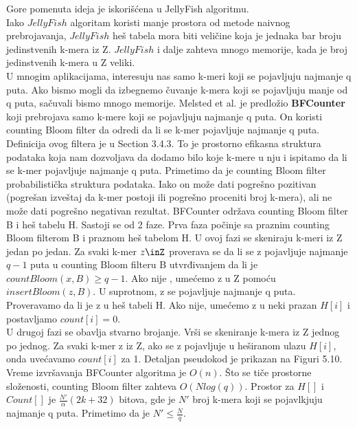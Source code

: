 \documentclass{article}
\begin{document}
Gore pomenuta ideja je iskorišćena u JellyFish algoritmu.\\

Iako $JellyFish$ algoritam koristi manje prostora od metode naivnog prebrojavanja, $JellyFish$ heš tabela mora biti veličine koja je jednaka bar broju jedinstvenih k-mera iz Z. $JellyFish$ i dalje zahteva mnogo memorije, kada je broj jedinstvenih k-mera u Z veliki.\\

U mnogim aplikacijama, interesuju nas samo k-meri koji se pojavljuju najmanje q puta. Ako bismo mogli da izbegnemo čuvanje k-mera koji se pojavljuju manje od q puta, sačuvali bismo mnogo memorije. Melsted et al. je predložio \textbf{BFCounter} koji prebrojava samo k-mere koji se pojavljuju najmanje q puta. On koristi counting Bloom filter da odredi da li se k-mer pojavljuje najmanje q puta. Definicija ovog filtera je u Section 3.4.3. To je prostorno efikasna struktura podataka koja nam dozvoljava da dodamo bilo koje k-mere u nju i ispitamo da li se k-mer pojavljuje najmanje q puta. Primetimo da je counting Bloom filter probabilistička struktura podataka. Iako on može dati pogrešno pozitivan (pogrešan izveštaj da k-mer postoji ili pogrešno proceniti broj k-mera), ali ne može dati pogrešno negativan rezultat. BFCounter održava counting Bloom filter B i heš tabelu H. Sastoji se od 2 faze. Prva faza počinje sa praznim counting Bloom filterom B i praznom heš tabelom H. U ovoj fazi se skeniraju k-meri iz Z jedan po jedan. Za svaki k-mer $z\inZ$ proverava se da li se z pojavljuje najmanje $q - 1$ puta u counting Bloom  filteru B utvrđivanjem da li je $countBloom(x, B) \geq q-1$. Ako nije , umećemo z u Z pomoću $insertBloom(z, B)$. U suprotnom, z se pojavljuje najmanje q puta. Proveravamo da li je z u heš tabeli H. Ako nije, umećemo z u neki prazan $H[i]$ i postavljamo $count[i] = 0$. \\

U drugoj fazi se obavlja stvarno brojanje. Vrši se skeniranje k-mera iz Z jednog po jednog. Za svaki k-mer z iz Z, ako se z pojavljuje u heširanom ulazu $H[i]$, onda uvećavamo $count[i]$ za 1. Detaljan pseudokod je prikazan na Figuri 5.10. \\

Vreme izvršavanja BFCounter algoritma je $O(n)$. Što se tiče prostorne složenosti, counting Bloom filter zahteva $O(N log(q))$. Prostor za $H[]$ i $Count[]$ je $\frac{N'}{\alpha}(2k + 32)$ bitova, gde je $N'$ broj k-mera koji se pojavlkjuju najmanje q puta. Primetimo da je $N' \leq \frac{N}{q}$. \\
\end{document}
